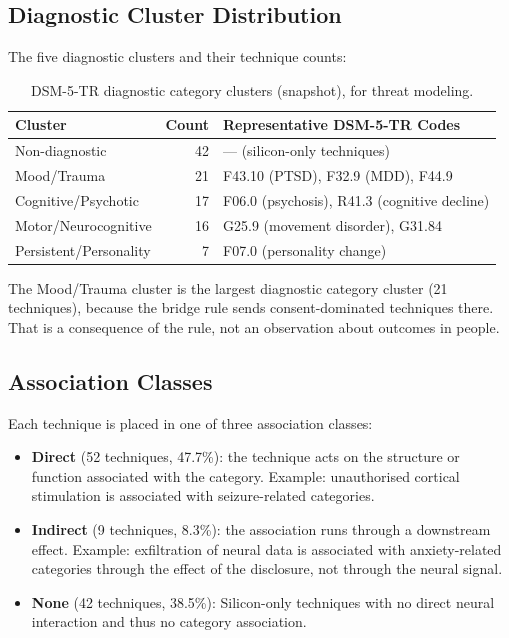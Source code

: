 \subsection{Diagnostic Cluster Distribution}

The five diagnostic clusters and their technique counts:

\begin{table}[H]
\centering
\caption{DSM-5-TR diagnostic category clusters (snapshot), for threat modeling.}
\label{tab:clusters}
\small
\begin{tabularx}{\textwidth}{@{}l r X@{}}
\toprule
\textbf{Cluster} & \textbf{Count} & \textbf{Representative DSM-5-TR Codes} \\
\midrule
Non-diagnostic          & 42 & --- (silicon-only techniques) \\
Mood/Trauma             & 21 & F43.10 (PTSD), F32.9 (MDD), F44.9 \\
Cognitive/Psychotic     & 17 & F06.0 (psychosis), R41.3 (cognitive decline) \\
Motor/Neurocognitive    & 16 & G25.9 (movement disorder), G31.84 \\
Persistent/Personality  &  7 & F07.0 (personality change) \\
\bottomrule
\end{tabularx}
\end{table}

The Mood/Trauma cluster is the largest diagnostic category cluster (21 techniques),
because the bridge rule sends consent-dominated techniques there. That is a consequence of
the rule, not an observation about outcomes in people.

\subsection{Association Classes}

Each technique is placed in one of three association classes:

\begin{itemize}
  \item \textbf{Direct} (52 techniques, 47.7\%): the technique acts on the
        structure or function associated with the category. Example: unauthorised
        cortical stimulation is associated with seizure-related categories.
  \item \textbf{Indirect} (9 techniques, 8.3\%): the association runs through a
        downstream effect. Example: exfiltration of neural data is associated with
        anxiety-related categories through the effect of the disclosure, not through
        the neural signal.
  \item \textbf{None} (42 techniques, 38.5\%): Silicon-only techniques with no
        direct neural interaction and thus no category association.
\end{itemize}


